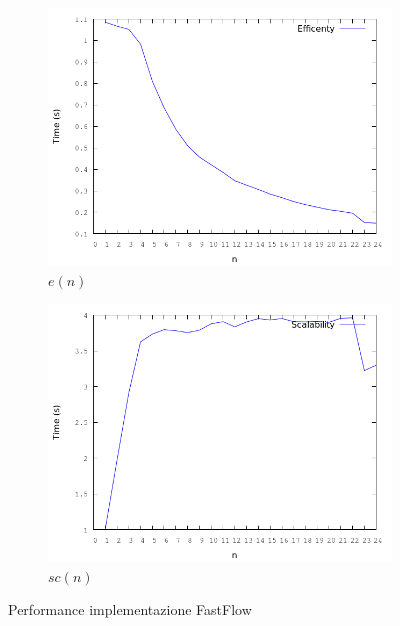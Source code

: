 \documentclass[12pt]{article}
\begin{document}
\begin{figure}[!htbp]
\begin{subfigure}{.55\textwidth}
  \includegraphics[scale=.35,keepaspectratio]{ff_ef.png}
  \caption{$e(n)$}
  \label{fig:lsec}
\end{subfigure}
\begin{subfigure}{.55\textwidth}
  \centering
  \includegraphics[scale=.35,keepaspectratio]{ff_sc.png}
  \caption{$sc(n)$}
  \label{fig:cacc}
\end{subfigure}
\caption{Performance implementazione FastFlow}
\label{img:plotsff}
\end{figure}
\end{document}
